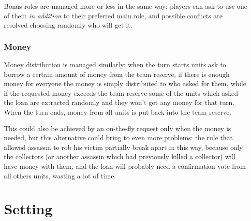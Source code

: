 				Bonus roles are managed more or less in the same way: players can ask to use one of them \emph{in addition} to their preferred main.role, and possible conflicts are resolved choosing randomly who will get it.
							
			\subsubsection{Money}
				Money distribution is managed similarly: when the turn starts units ask to borrow a certain amount of money from the team reserve, if there is enough money for everyone the money is simply distributed to who asked for them, while if the requested money exceeds the team reserve some of the units which asked the loan are extracted randomly and they won't get any money for that turn.
				When the turn ends, money from all units is put back into the team reserve.
				
				This could also be achieved by an on-the-fly request only when the money is needed, but this alternative could bring to even more problems: the rule that allowed assassin to rob his victim partially break apart in this way, because only the collectors (or another assassin which had previously killed a collector) will have money with them, and the loan will probably need a confirmation vote from all others units, wasting a lot of time.
	
	\section{Setting}
	
		